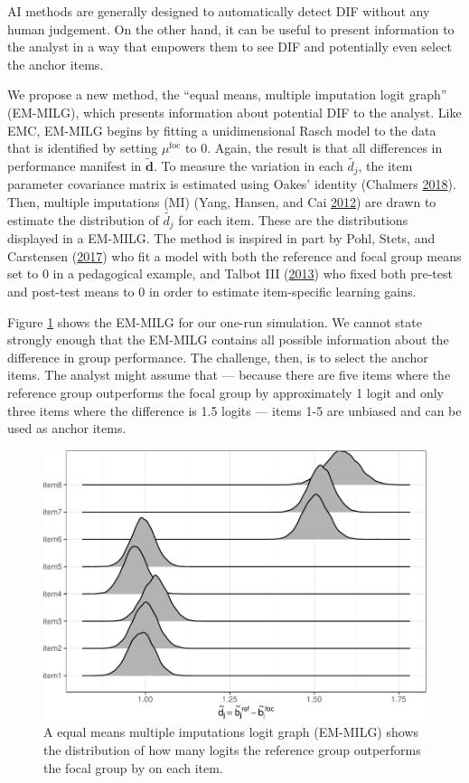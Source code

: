 \documentclass[
  11pt,
]{article}
\begin{document}
AI methods are generally designed to automatically detect DIF without any human judgement. On the other hand, it can be useful to present information to the analyst in a way that empowers them to see DIF and potentially even select the anchor items.

We propose a new method, the \enquote{equal means, multiple imputation logit graph} (EM-MILG), which presents information about potential DIF to the analyst. Like EMC, EM-MILG begins by fitting a unidimensional Rasch model to the data that is identified by setting \(\mu^\text{foc}\) to \(0\). Again, the result is that all differences in performance manifest in \(\tilde{\mathbf{d}}\). To measure the variation in each \(\tilde{{d_j}}\), the item parameter covariance matrix is estimated using Oakes' identity (Chalmers \protect\hyperlink{ref-chalmers2018numerical}{2018}). Then, multiple imputations (MI) (Yang, Hansen, and Cai \protect\hyperlink{ref-yang2012characterizing}{2012}) are drawn to estimate the distribution of \(\tilde{d_j}\) for each item. These are the distributions displayed in a EM-MILG. The method is inspired in part by Pohl, Stets, and Carstensen (\protect\hyperlink{ref-pohl2017cluster}{2017}) who fit a model with both the reference and focal group means set to 0 in a pedagogical example, and Talbot III (\protect\hyperlink{ref-talbot2013taking}{2013}) who fixed both pre-test and post-test means to 0 in order to estimate item-specific learning gains.

Figure \ref{fig:emmilg} shows the EM-MILG for our one-run simulation. We cannot state strongly enough that the EM-MILG contains all possible information about the difference in group performance. The challenge, then, is to select the anchor items. The analyst might assume that --- because there are five items where the reference group outperforms the focal group by approximately 1 logit and only three items where the difference is 1.5 logits --- items 1-5 are unbiased and can be used as anchor items.

\begin{figure}[H]

{\centering \includegraphics[width=0.7\linewidth]{paper_files/figure-latex/emmilg-1} 

}

\caption{A equal means multiple imputations logit graph (EM-MILG) shows the distribution of how many logits the reference group outperforms the focal group by on each item.}\label{fig:emmilg}
\end{figure}
\end{document}
